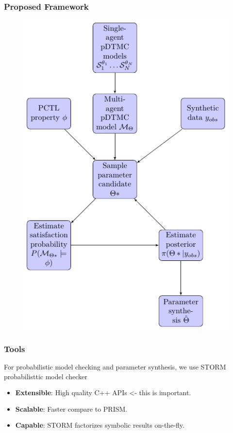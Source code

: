 \documentclass{beamer}
\begin{document}
\begin{frame}
  \frametitle{Proposed Framework}
  \begin{figure}[t]
    \includegraphics[height=\textheight]{framework.png} \centering
  \end{figure}
\end{frame}

\begin{frame}
  \frametitle{Tools}
  For probabilistic model checking and parameter synthesis, we use STORM
  probabilisttic model checker
  \begin{itemize}
    \item \textbf{Extensible}: High quality C++ APIs <- this is important.
    \item \textbf{Scalable}: Faster compare to PRISM.
    \item \textbf{Capable}: STORM factorizes symbolic results on-the-fly.
  \end{itemize}
\end{frame}
\end{document}
